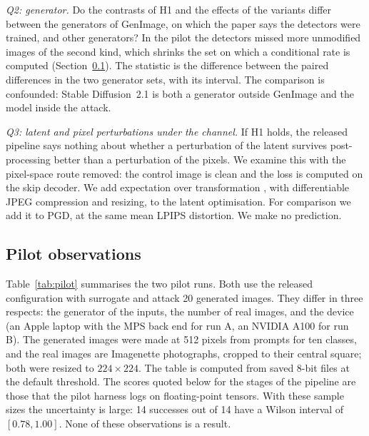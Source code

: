 \emph{Q2: generator.} Do the contrasts of H1 and the effects of the variants differ between the
generators of GenImage, on which the paper says the detectors were trained, and other generators?
In the pilot the detectors missed more unmodified images of the second kind, which shrinks the set
on which a conditional rate is computed (Section~\ref{sec:pilot}). The statistic is the difference
between the paired differences in the two generator sets, with its interval. The comparison is
confounded: Stable Diffusion~2.1 is both a generator outside GenImage and the model inside the
attack.

\emph{Q3: latent and pixel perturbations under the channel.} If H1 holds, the released pipeline
says nothing about whether a perturbation of the latent survives post-processing better than a
perturbation of the pixels. We examine this with the pixel-space route removed: the control image
is clean and the loss is computed on the skip decoder. We add expectation over transformation
, with differentiable JPEG compression and resizing, to the latent
optimisation. For comparison we add it to PGD, at the same mean LPIPS distortion. We make no
prediction.

\subsection{Pilot observations}
\label{sec:pilot}

Table~\ref{tab:pilot} summarises the two pilot runs. Both use the released configuration with
surrogate \detE and attack 20 generated images. They differ in three respects: the generator of the
inputs, the number of real images, and the device (an Apple laptop with the MPS back end for run A,
an NVIDIA A100 for run B). The generated images were made at 512 pixels from prompts for ten
classes, and the real images are Imagenette photographs, cropped to their central square; both
were resized to $224\times224$. The table is computed from saved 8-bit files at the default
threshold. The scores quoted below for the stages of the pipeline are those that the pilot harness
logs on floating-point tensors. With these sample sizes the uncertainty is large: 14 successes out
of 14 have a Wilson interval of $[0.78,1.00]$. None of these observations is a result.

